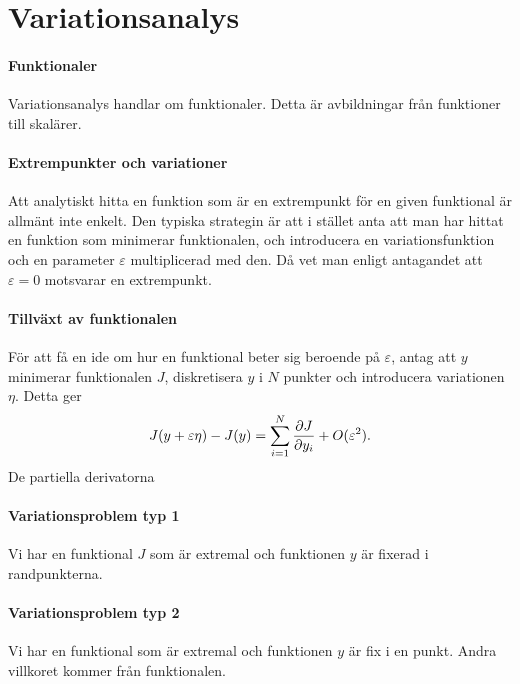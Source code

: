 \section{Variationsanalys}

\paragraph{Funktionaler}
Variationsanalys handlar om funktionaler. Detta är avbildningar från funktioner till skalärer.

\paragraph{Extrempunkter och variationer}
Att analytiskt hitta en funktion som är en extrempunkt för en given funktional är allmänt inte enkelt. Den typiska strategin är att i stället anta att man har hittat en funktion som minimerar funktionalen, och introducera en variationsfunktion och en parameter $\varepsilon$ multiplicerad med den. Då vet man enligt antagandet att $\varepsilon = 0$ motsvarar en extrempunkt.

\paragraph{Tillväxt av funktionalen}
För att få en ide om hur en funktional beter sig beroende på $\varepsilon$, antag att $y$ minimerar funktionalen $J$, diskretisera $y$ i $N$ punkter och introducera variationen $\eta$. Detta ger
\begin{align*}
	J(y + \varepsilon\eta) - J(y) = \sum\limits_{i = 1}^{N}\pdv{J}{y_{i}} + O(\varepsilon^{2}).
\end{align*}
De partiella derivatorna

\paragraph{Variationsproblem typ 1}
Vi har en funktional $J$ som är extremal och funktionen $y$ är fixerad i randpunkterna.

\paragraph{Variationsproblem typ 2}
Vi har en funktional som är extremal och funktionen $y$ är fix i en punkt. Andra villkoret kommer från funktionalen.

